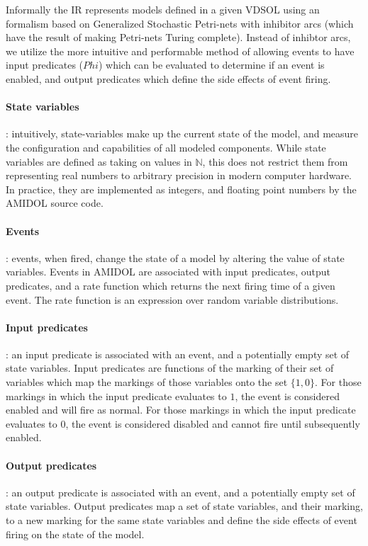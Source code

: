 \documentclass[11pt]{article}
\newcommand{\amidol}{\textsc{AMIDOL}}
\begin{document}
Informally the IR represents models defined in a given VDSOL using an formalism based on Generalized Stochastic Petri-nets with inhibitor arcs (which have the result of making Petri-nets Turing complete).  Instead of inhibtor arcs, we utilize the more intuitive and performable method of allowing events to have input predicates ($Phi$) which can be evaluated to determine if an event is enabled, and output predicates which define the side effects of event firing.

\paragraph{State variables}: intuitively, state-variables make up the current state of the model, and measure the configuration and capabilities of all modeled components.  While state variables are defined as taking on values in $\mathbb{N}$, this does not restrict them from representing real numbers to arbitrary precision in modern computer hardware.  In practice, they are implemented as integers, and floating point numbers by the \amidol{} source code.

\paragraph{Events}: events, when fired, change the state of a model by altering the value of state variables.  Events in \amidol{} are associated with input predicates, output predicates, and a rate function which returns the next firing time of a given event.  The rate function is an expression over random variable distributions.

\paragraph{Input predicates}: an input predicate is associated with an event, and a potentially empty set of state variables.  Input predicates are functions of the marking of their set of variables which map the markings of those variables onto the set $\{1, 0\}$.  For those markings in which the input predicate evaluates to $1$, the event is considered enabled and will fire as normal.  For those markings in which the input predicate evaluates to $0$, the event is considered disabled and cannot fire until subsequently enabled.

\paragraph{Output predicates}: an output predicate is associated with an event, and a potentially empty set of state variables.  Output predicates map a set of state variables, and their marking, to a new marking for the same state variables and define the side effects of event firing on the state of the model.
\end{document}
